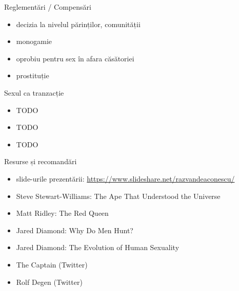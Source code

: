 \documentclass{simple}
\begin{document}
\begin{frame}{Reglementări / Compensări}
  \begin{itemize}
    \pause
    \item decizia la nivelul părinților, comunității
    \pause
    \item monogamie
    \pause
    \item oprobiu pentru sex în afara căsătoriei
    \pause
    \item prostituție
  \end{itemize}
\end{frame}

\begin{frame}{Sexul ca tranzacție}
  \begin{itemize}
    \item TODO
    \item TODO
    \item TODO
  \end{itemize}
\end{frame}

%

\begin{frame}{Resurse și recomandări}
  \begin{itemize}
    \item slide-urile prezentării: \url{https://www.slideshare.net/razvandeaconescu/}
    \item Steve Stewart-Williams: The Ape That Understood the Universe
    \item Matt Ridley: The Red Queen
    \item Jared Diamond: Why Do Men Hunt?
    \item Jared Diamond: The Evolution of Human Sexuality
    \item The Captain (Twitter)
    \item Rolf Degen (Twitter)
  \end{itemize}
\end{frame}
\end{document}

